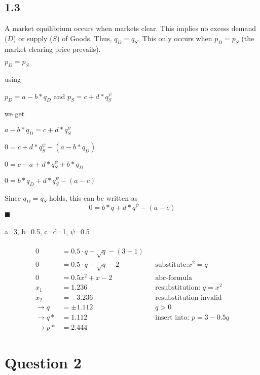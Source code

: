 \documentclass{article}
\begin{document}
\subsection*{1.3}
A market equilibrium occurs when markets clear. This implies no excess demand ($D$) or supply ($S$) of Goods. Thus, $q_D = q_S$. This only occurs when $p_D = p_S$ (the market clearing price prevails).
\begin{center} $p_D = p_S$ \end{center}
using
\begin{center} $p_D=a-b*q_D $ and $p_S=c+d*q_S^\psi$\end{center}
 we get
\begin{center} $a-b*q_D =c+d*q_S^\psi$ \end{center}
\begin{center} $0 =c+d*q_S^\psi-(a-b*q_D)$ \end{center}
\begin{center} $0 =c-a+d*q_S^\psi+b*q_D$ \end{center}
\begin{center} $0 =b*q_D+d*q_S^\psi-(a-c)$ \end{center}
Since $q_D = q_S$ holds, this can be written as 
 \begin{equation*} \label{First_One}0=b*q+d*q^\psi-(a-c)\end{equation*} $\blacksquare$\\\\
 a=3, b=0.5, c=d=1, $\psi$=0.5\\\\
 \begin{align*}
 0&=0.5\cdot q+ \sqrt{q}-(3-1) & &\\
 0&=0.5\cdot q+ \sqrt{q}-2 & &\text{substitute:} x^2=q\\
 0&=0.5x^2+x-2&&\text{abc-formula}\\
 x_1&=1.236 &&\text{resubstitution: } q=x^2\\
 x_2&=-3.236&&\text{resubstitution invalid}\\
 \rightarrow q&=\pm 1.112 &&q>0 \\
 \rightarrow q*&=1.112&&\text{insert into: }p=3-0.5q\\
 \rightarrow p*&=2.444&& 
 \end{align*}





\section*{Question 2}

\end{document}
